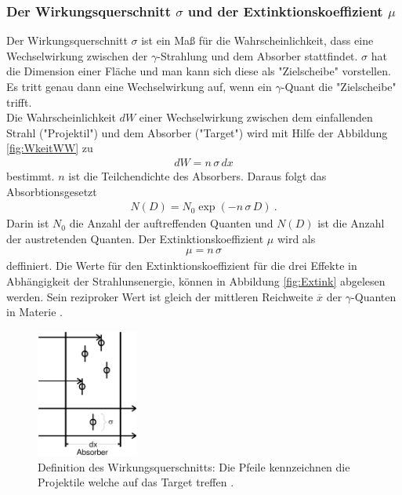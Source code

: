 \subsubsection{Der Wirkungsquerschnitt \texorpdfstring{$\sigma$}{} und der Extinktionskoeffizient \texorpdfstring{$\mu$}{}}
Der Wirkungsquerschnitt $\sigma$ ist ein Maß für die Wahrscheinlichkeit, dass eine Wechselwirkung zwischen der $\gamma$-Strahlung und dem Absorber stattfindet. $\sigma$ hat die Dimension einer Fläche und man kann sich diese als "Zielscheibe" vorstellen.  Es tritt genau dann eine Wechselwirkung auf, wenn ein $\gamma$-Quant die "Zielscheibe" trifft. \\
Die Wahrscheinlichkeit $dW$ einer Wechselwirkung zwischen dem einfallenden Strahl ("Projektil") und dem Absorber ("Target") wird mit Hilfe der Abbildung \eqref{fig:WkeitWW} zu
\begin{align}
	dW = n\,\sigma\,dx
\end{align}
bestimmt. $n$ ist die Teilchendichte des Absorbers.
Daraus folgt das Absorbtionsgesetzt
\begin{align}
	N(D) = N_0 \exp(-n\,\sigma\,D) \ .
	\label{eqn:Absorbtion}
\end{align}
Darin ist $N_0$ die Anzahl der auftreffenden Quanten und $N(D)$ ist die Anzahl der austretenden Quanten. Der Extinktionskoeffizient $\mu$ wird als
\begin{align}
	\mu = n\,\sigma
\end{align}
deffiniert. Die Werte für den Extinktionskoeffizient für die drei Effekte in Abhängigkeit der Strahlunsenergie, können in Abbildung \eqref{fig:Extink} abgelesen werden. Sein reziproker Wert ist gleich der mittleren Reichweite $\overline{x}$ der $\gamma$-Quanten in Materie \cite[2]{V18}.

\begin{figure}
	\centering
	\includegraphics[width=0.3\textwidth]{Bilder/WkeitWW.png}
	\caption{Definition des Wirkungsquerschnitts: Die Pfeile kennzeichnen die Projektile welche auf das Target treffen \cite{V18}.}
	\label{fig:WkeitWW}
\end{figure}

